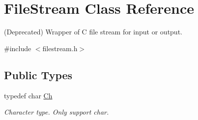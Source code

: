 \hypertarget{classFileStream}{}\section{File\+Stream Class Reference}
\label{classFileStream}


(Deprecated) Wrapper of C file stream for input or output.  




{\ttfamily \#include $<$filestream.\+h$>$}

\subsection*{Public Types}
\begin{DoxyCompactItemize}
\item 
\mbox{\label{classFileStream_a400811e8f4424670049662a79ea29a74}} 
typedef char \hyperlink{classFileStream_a400811e8f4424670049662a79ea29a74}{Ch}
\begin{DoxyCompactList}\small\item\em Character type. Only support char. \end{DoxyCompactList}\end{DoxyCompactItemize}
